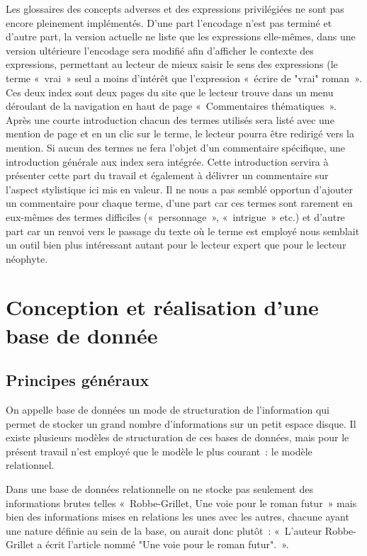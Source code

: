 \documentclass[12pt, a4paper]{article}
\begin{document}
Les glossaires des concepts adverses et des expressions privilégiées ne sont pas encore pleinement implémentés. D'une part l'encodage n'est pas terminé et d'autre part, la version actuelle ne liste que les expressions elle-mêmes, dans une version ultérieure l'encodage sera modifié afin d'afficher le contexte des expressions, permettant au lecteur de mieux saisir le sens des expressions (le terme «~vrai~» seul a moins d'intérêt que l'expression «~écrire de "vrai" roman~». %
 Ces deux index sont deux pages du site que le lecteur trouve dans un menu déroulant de la navigation en haut de page «~Commentaires thématiques~». Après une courte introduction chacun des termes utilisés sera listé avec une mention de page et en un clic sur le terme, le lecteur pourra être redirigé vers la mention. Si aucun des termes ne fera l'objet d'un commentaire spécifique, une introduction générale aux index sera intégrée. Cette introduction servira à présenter cette part du travail et également à délivrer un commentaire sur l'aspect stylistique ici mis en valeur. Il ne nous a pas semblé opportun d'ajouter un commentaire pour chaque terme, d'une part car ces termes sont rarement en eux-mêmes des termes difficiles («~personnage~», «~intrigue~» etc.) et d'autre part car un renvoi vers le passage du texte où le terme est employé nous semblait un outil bien plus intéressant autant pour le lecteur expert que pour le lecteur néophyte.






\section{Conception et réalisation d'une base de donnée}
    \subsection{Principes généraux}
    On appelle base de données un mode de structuration de l'information qui permet de stocker un grand nombre d'informations sur un petit espace disque. Il existe plusieurs modèles de structuration de ces bases de données, mais pour le présent travail n'est employé que le modèle le plus courant~: le modèle relationnel.

    Dans une base de données relationnelle on ne stocke pas seulement des informations brutes telles «~Robbe-Grillet, Une voie pour le roman futur~» mais bien des informations mises en relations les unes avec les autres, chacune ayant une nature définie au sein de la base, on aurait donc plutôt~: «~L'auteur Robbe-Grillet a écrit l'article nommé "Une voie pour le roman futur".~».
\end{document}
